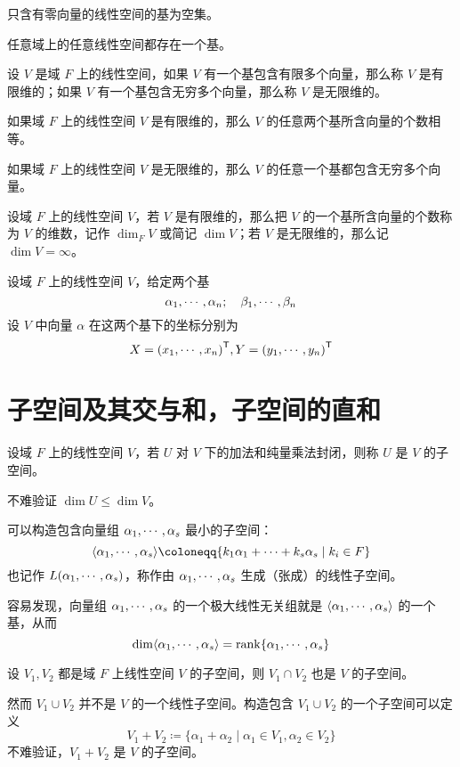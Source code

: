 只含有零向量的线性空间的基为空集。

\begin{theorem}
    任意域上的任意线性空间都存在一个基。
\end{theorem}

\begin{definition}
    设 $V$ 是域 $F$ 上的线性空间，如果 $V$ 有一个基包含有限多个向量，那么称 $V$ 是有限维的；如果 $V$ 有一个基包含无穷多个向量，那么称 $V$ 是无限维的。
\end{definition}

如果域 $F$ 上的线性空间 $V$ 是有限维的，那么 $V$ 的任意两个基所含向量的个数相等。

如果域 $F$ 上的线性空间 $V$ 是无限维的，那么 $V$ 的任意一个基都包含无穷多个向量。

\begin{definition}
    设域 $F$ 上的线性空间 $V$，若 $V$ 是有限维的，那么把 $V$ 的一个基所含向量的个数称为 $V$ 的维数，记作 $\dim_{F} V$ 或简记 $\dim V$；若 $V$ 是无限维的，那么记 $\dim V = \infty$。
\end{definition}

设域 $F$ 上的线性空间 $V$，给定两个基
\[ \alpha_1,\cdots,\alpha_n; \quad \beta_1,\cdots,\beta_n \]
设 $V$ 中向量 $\alpha$ 在这两个基下的坐标分别为
\[ X = {(x_1,\cdots,x_n)}^\mathsf{T}, Y = {(y_1,\cdots,y_n)}^\mathsf{T} \]

\section{子空间及其交与和，子空间的直和}

设域 $F$ 上的线性空间 $V$，若 $U$ 对 $V$ 下的加法和纯量乘法封闭，则称 $U$ 是 $V$ 的子空间。

不难验证 $\dim U \leqslant \dim V$。

可以构造包含向量组 $\alpha_1,\cdots,\alpha_s$ 最小的子空间：
\[ \langle \ji{\alpha}{s} \rangle \coloneqq \{ k_1\alpha_1+\cdots+k_s\alpha_s \mid k_i\in F \} \]
也记作 $L(\alpha_1,\cdots,\alpha_s)$，称作由 $\alpha_1,\cdots,\alpha_s$ 生成（张成）的线性子空间。

容易发现，向量组 $\alpha_1,\cdots,\alpha_s$ 的一个极大线性无关组就是 $\langle \alpha_1,\cdots,\alpha_s \rangle$ 的一个基，从而
\[ \dim \langle \alpha_1,\cdots,\alpha_s \rangle = \operatorname{rank} \{ \alpha_1,\cdots,\alpha_s \}\]

\begin{theorem}
    设 $V_1,V_2$ 都是域 $F$ 上线性空间 $V$ 的子空间，则 $V_1 \cap V_2$ 也是 $V$ 的子空间。
\end{theorem}

然而 $V_1 \cup V_2$ 并不是 $V$ 的一个线性子空间。构造包含 $V_1 \cup V_2$ 的一个子空间可以定义
\[ V_1+V_2 \coloneqq \{ \alpha_1+\alpha_2 \mid \alpha_1\in V_1, \alpha_2\in V_2 \} \]
不难验证，$V_1+V_2$ 是 $V$ 的子空间。

